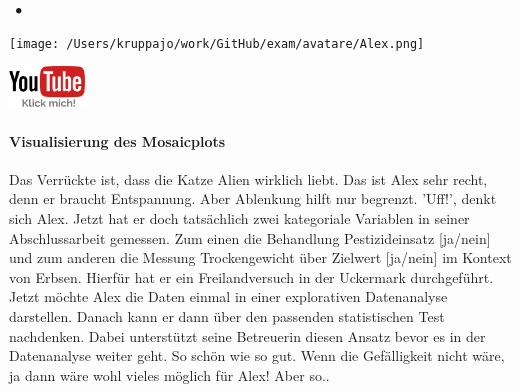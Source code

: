 \documentclass[a4paper, 9pt]{scrartcl}\usepackage[]{graphicx}\usepackage[]{xcolor}
\begin{document}
 
\ifcollection
\begin{flushright}
\tiny\vspace{-3Ex}
\textbf{\examinhaltstart}
\exammodulestat $\;\bullet$
\exammodulestatbbv 
\vspace{-4Ex}
\end{flushright}
\begin{minipage}[t]{0.5\textwidth}
\texttt{[image: /Users/kruppajo/work/GitHub/exam/avatare/Alex.png]}
\end{minipage}
\begin{minipage}[t]{0.5\textwidth}
\hfill
\href{https://youtu.be/L4nSytEHcaE}{\includegraphics[width = 2cm]{img/youtube}}
\end{minipage}
\vspace{-3ex}
\fi



\ifcollection
\paragraph{Visualisierung des Mosaicplots}
\fi

Das Verrückte ist, dass die Katze Alien wirklich liebt. Das ist Alex sehr recht, denn er braucht Entspannung. Aber Ablenkung hilft nur begrenzt. 'Uff!', denkt sich Alex. Jetzt hat er doch tatsächlich zwei kategoriale Variablen in seiner Abschlussarbeit gemessen. Zum einen die Behandlung Pestizideinsatz [ja/nein] und zum anderen die Messung Trockengewicht über Zielwert [ja/nein] im Kontext von Erbsen. Hierfür hat er ein Freilandversuch in der Uckermark durchgeführt. Jetzt möchte Alex die Daten einmal in einer explorativen Datenanalyse darstellen. Danach kann er dann über den passenden statistischen Test nachdenken. Dabei unterstützt seine Betreuerin diesen Ansatz bevor es in der Datenanalyse weiter geht. So schön wie so gut. Wenn die Gefälligkeit nicht wäre, ja dann wäre wohl vieles möglich für Alex! Aber so..



\vspace{1Ex}
\end{document}
